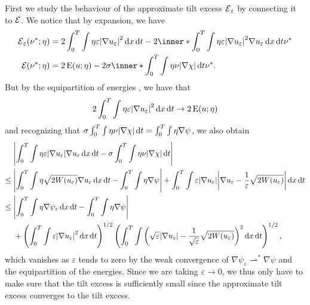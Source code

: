 First we study the behaviour of the approximate tilt excess $ \tilt_excess_{ \varepsilon } $ by connecting it to $ \tilt_excess $. We notice that by expansion, we have
\begin{align*}
	\tilt_excess_{ \varepsilon } ( \nu^{ \ast } ; \eta )
	& =
	2
	\int_{ 0 }^{ T }
	\int
	\eta
	\varepsilon 
	\abs{ \nabla u_{ \varepsilon } }^{ 2 }
	\dd{ x }
	\dd{ t }
	-
	2 
	\inner*{\int_{ 0 }^{ T }
		\int
		\eta
		\varepsilon
		\abs{ \nabla u_{ \varepsilon } }^{ 2 }
		\nabla u_{ \varepsilon }
		\dd{ x }
		\dd{ t } }
	{ \nu^{ \ast } }
	\\
	\tilt_excess ( \nu^{ \ast } ; \eta )
	& =
	2 \energy ( u ; \eta )
	-
	2 \sigma
	\inner*{
		\int_{ 0 }^{ T }
		\int
		\eta
		\nu 
		\abs{ \nabla \chi }
		\dd{ t }
	}{ \nu^{ \ast } }.
\end{align*}
But by the equipartition of energies , we have that
\begin{equation*}
	2 \int_{ 0 }^{ T }
	\int
	\eta \varepsilon 
	\abs{ \nabla u_{ \varepsilon } }^{ 2 }
	\dd{ x }
	\dd{ t }
	\to 
	2 \operatorname{E} ( u ; \eta )
\end{equation*} 
and recognizing that $ \sigma \int_{0 }^{ T } \int \eta \nu \abs{ \nabla \chi } \dd{ t } = \int_{ 0 }^{ T } \int \eta \nabla \psi $, we also obtain
\begin{align*}
	& 
	\abs{ 
		\int_{ 0 }^{ T }
		\int
		\eta
		\varepsilon
		\abs{ \nabla u_{ \varepsilon } }
		\nabla u_{ \varepsilon }
		\dd{ x }
		\dd{ t }
		-
		\sigma
		\int_{ 0 }^{ T }
		\int
		\eta
		\nu 
		\abs{ \nabla \chi }
		\dd{ t }
	}
	\\
	\leq {} &
	\abs{
		\int_{ 0 }^{ T }
		\int	
		\eta
		\sqrt{ 2 W ( u_{ \varepsilon } ) }
		\nabla u_{ \varepsilon }
		\dd{ x }
		\dd{ t }
		-
		\int_{ 0 }^{ T }
		\int
		\eta
		\nabla \psi
	}
	+
	\int_{ 0 }^{ T }
	\int
	\varepsilon
	\abs{ \nabla u_{ \varepsilon } }
	\abs{ \nabla u_{ \varepsilon } - \frac{ 1 }{ \varepsilon } \sqrt{ 2 W ( u_{ \varepsilon } ) } }
	\dd{ x }
	\dd{ t }
	\\
	\leq {} &
	\abs{
		\int_{ 0 }^{ T }
		\int
		\eta
		\nabla \psi_{ \varepsilon } 
		\dd{ x }
		\dd{ t }
		-
		\int_{ 0 }^{ T }
		\int
		\eta
		\nabla \psi 
	}
	\\
	& +
	\left(
	\int_{ 0 }^{ T }
	\int
	\varepsilon \abs{ \nabla u_{ \varepsilon } }^{ 2 }
	\dd{ x }
	\dd{ t }
	\right)^{ 1/2 }
	\left(
	\int_{ 0 }^{ T }
	\int
	\left(
	\sqrt{ \varepsilon }
	\abs{ \nabla u_{ \varepsilon } }
	-
	\frac{ 1 }{ \sqrt{ \varepsilon } }
	\sqrt{ 2 W ( u_{ \varepsilon } ) }
	\right)^{ 2 }
	\dd{ x }
	\dd{ t }
	\right)^{ 1/2 },
\end{align*}
which vanishes as $ \varepsilon $ tends to zero by the weak convergence of $ \nabla \psi_{ \varepsilon } \rightharpoonup^{ \ast } \nabla \psi $ and the equipartition of the energies.
Since we are taking $ \varepsilon \to 0 $, we thus only have to make sure that the tilt excess is sufficiently small since the approximate tilt excess converges to the tilt excess.

